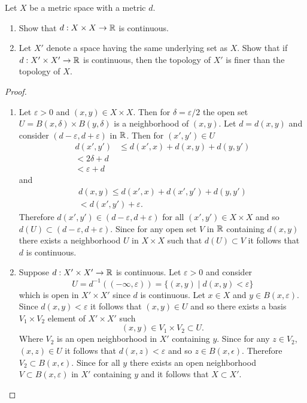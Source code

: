 \begin{ex}{20.3}
    Let $X$ be a metric space with a metric $d$.
    \begin{enumerate}
        \item Show that $d:X\times X\to\mathbb{R}$ is continuous.
        \item Let $X'$ denote a space having the same underlying set as $X$. Show that if $d:X'\times X'\to\mathbb{R}$ is continuous, then the topology of $X'$ is finer than the topology of $X$.
    \end{enumerate}
\end{ex}
\begin{proof}
    ${}$
    \begin{enumerate}
        \item Let $\varepsilon>0$ and $(x,y)\in X\times X$. Then for $\delta=\varepsilon/2$ the open set $U =B(x,\delta)\times B(y,\delta)$ is a neighborhood of $(x,y)$.
            Let $d=d(x,y)$ and consider $(d-\varepsilon, d+\varepsilon)$ in $\mathbb{R}$. 
            Then for $(x',y')\in U$
            \begin{align*}
                d(x',y')&\leq d(x',x)+d(x,y)+d(y,y')\\
                < 2\delta+ d\\
                < \varepsilon+d
            \end{align*}
            and
            \begin{align*}
                d(x,y)\leq d(x',x)+d(x',y')+d(y,y')\\
                <d(x',y')+\varepsilon.
            \end{align*}
            Therefore $d(x',y')\in(d-\varepsilon,d+\varepsilon)$ for all $(x',y')\in X\times X$ and so $d(U)\subset (d-\varepsilon,d+\varepsilon)$.
            Since for any open set $V$ in $\mathbb{R}$ containing $d(x,y)$ there exists a neighborhood $U$ in $X\times X$ such that $d(U)\subset V$ it follows that $d$ is continuous.
        \item  Suppose $d:X'\times X'\to \mathbb{R}$ is continuous. Let $\varepsilon>0$ and consider
            $$ U = d^{-1}\left((-\infty,\varepsilon)\right)=\{(x,y)\mid d(x,y)<\varepsilon\}$$
            which is open in $X'\times X'$ since $d$ is continuous. Let $x\in X$ and $y\in B(x,\varepsilon)$.
            Since $d(x,y)<\varepsilon$ it follows that $(x,y)\in U$ and so there exists a basis $V_1\times V_2$ element of $X'\times X'$ such
            $$ (x,y)\in V_1\times V_2\subset U.$$
            Where $V_2$ is an open neighborhood in $X'$ containing $y$.
            Since for any $z\in V_2$, $(x,z)\in U$ it follows that $d(x,z)<\varepsilon$ and so $z\in B(x,\epsilon)$. Therefore $V_2\subset B(x,\epsilon)$.
            Since for all $y$ there exists an open neighborhood $V\subset B(x,\varepsilon)$ in $X'$ containing $y$ and it follows that $X\subset X'$.
    \end{enumerate}
\end{proof}